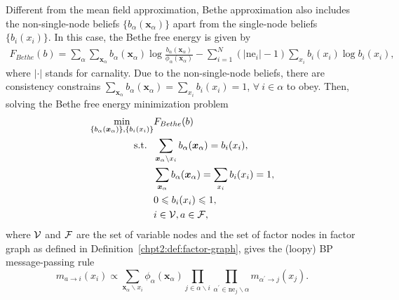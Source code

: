 Different from the mean field approximation, Bethe approximation also includes the non-single-node beliefs $\{b_{\alpha}(\bm{x}_{\alpha})\}$ apart from the single-node beliefs $\{b_i(x_i)\}$\cite{yedidia2003understanding}. In this case, the Bethe free energy is given by
\begin{align}\label{chpt2:bethe-free-energy}
  F_{Bethe}(b) = \sum_{\alpha} \sum_{\bm{x}_{\alpha}}
  b_{\alpha}(\bm{x}_{\alpha})\log{\frac{b_{\alpha}(\bm{x}_{\alpha})}{\phi_{\alpha}(\bm{x}_{\alpha})}
  } -  \sum_{i=1}^{N} (|\mathrm{ne}_i| - 1) \sum_{x_i} b_i(x_i) \log{b_i(x_i)},
\end{align}
where $|\cdot|$ stands for carnality.
Due to the  non-single-node beliefs, there are consistency constrains $\sum_{\bm{x}_{\alpha}} b_{\alpha}(\bm{x}_{\alpha}) = \sum_{ x_i} b_i({x}_i) =1$, $\forall~ i \in \alpha$ to obey. Then, solving the Bethe free energy minimization problem
\begin{align}
  \min_{\{b_{\alpha}(\bm{x}_{\alpha})\}, \{b_i(x_i)\}}& F_{Bethe}(b) \nonumber \\
  \mathrm{s.t.}~~ & \sum_{\bm{x}_{\alpha} \backslash x_i} b_{\alpha}(\bm{x}_{\alpha})  =
                    b_i(x_i), \nonumber \\
                                                      & \sum_{\bm{x}_{\alpha}} b_{\alpha}(\bm{x}_{\alpha}) = \sum_{ x_i} b_i({x}_i) =1,
                                                        \nonumber \\
                                                      &  0 \leqslant b_i(x_i) \leqslant 1,  \nonumber \\
                                                      & i \in \mathcal{V} , a \in \mathcal{F},
\end{align}
where $\mathcal{V}$ and $\mathcal{F}$ are the set of variable nodes and the set of
factor nodes in factor graph as defined in
Definition~\ref{chpt2:def:factor-graph}, gives the (loopy) BP message-passing rule
\begin{equation}\label{chpt2:eq:loopy-bp}
  m_{a\rightarrow i}(x_i) \propto \sum_{\bm{x}_{\alpha} \backslash x_i}
  \phi_{\alpha}(\bm{x}_{\alpha}) \prod_{j \in \alpha \backslash i} \prod_{\alpha^{\prime} \in \mathrm{ne}_j
    \backslash \alpha} m_{\alpha^{\prime}\rightarrow j}(x_j).
\end{equation}


